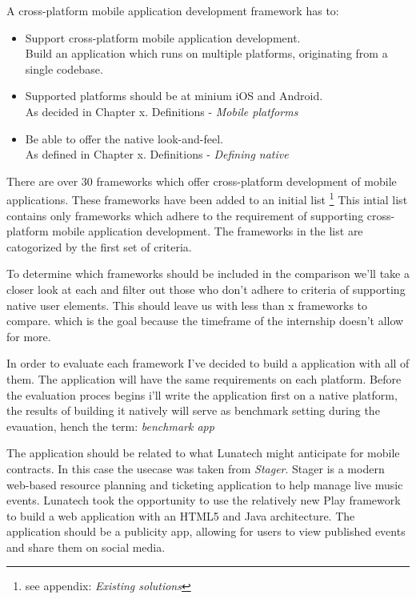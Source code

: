 
A cross-platform mobile application development framework has to:
\begin{itemize}
\item Support cross-platform mobile application development.\\
Build an application which runs on multiple platforms, originating from a single codebase.
\item Supported platforms should be at minium iOS and Android.\\
As decided in Chapter x. Definitions - \emph{Mobile platforms}
\item Be able to offer the native look-and-feel.\\
As defined in Chapter x. Definitions - \emph{Defining native}
\end{itemize}



There are over 30 frameworks which offer cross-platform development of mobile applications\cite{Wikipedia2012}. These frameworks have been added to an initial list \footnote{see appendix: \emph{Existing solutions}} This intial list contains only frameworks which adhere to the requirement of supporting cross-platform mobile application development. The frameworks in the list are catogorized by the first set of criteria.

To determine which frameworks should be included in the comparison we'll take a closer look at each and filter out those who don't adhere to criteria of supporting native user elements. This should leave us with less than x frameworks to compare. which is the goal because the timeframe of the internship doesn't allow for more. 


In order to evaluate each framework I've decided to build a application with all of them. The application will have the same requirements on each platform. Before the evaluation proces begins i'll write the application first on a native platform, the results of building it natively will serve as benchmark setting during the evauation, hench the term: \emph{benchmark app}

The application should be related to what Lunatech might anticipate for mobile contracts. In this case the usecase was taken from \emph{Stager}. Stager is a modern web-based resource planning and ticketing application to help manage live music events. Lunatech took the opportunity to use the relatively new Play framework to build a web application with an HTML5 and Java architecture. The application should be a publicity app, allowing for users to view published events and share them on social media.

